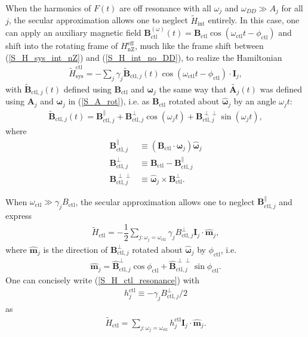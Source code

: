 \documentclass[twocolumn]{revtex4-1}
\renewcommand{\t}{\text} %
\newcommand{\f}[2]{\dfrac{#1}{#2}} %
\newcommand{\p}[1]{\left(#1\right)} %
\renewcommand{\v}{\bm} %
\newcommand{\uv}[1]{\hat{\v{#1}}} %
\renewcommand{\c}{\cdot} %
\begin{document}
When the harmonics of $F\p{t}$ are off resonance with all $\omega_j$
and $\omega_{DD}\gg A_j$ for all $j$, the secular approximation allows
one to neglect $\tilde H_\t{int}$ entirely. In this case, one can
apply an auxiliary magnetic field
$\v B_\t{ctl}^{\p\omega}\p{t}=\v
B_\t{ctl}\cos\p{\omega_\t{ctl}t-\phi_\t{ctl}}$ and shift into the
rotating frame of $H_\t{nZ}^\t{eff}$, much like the frame shift
between (\ref{S_H_sys_int_nZ}) and (\ref{S_H_int_no_DD}), to realize
the Hamiltonian
\begin{align}
  \tilde H_\t{sys}^\t{ctl} =
  -\sum_j\gamma_j\tilde{\v B}_{\t{ctl},j}\p{t}
  \cos\p{\omega_\t{ctl}t-\phi_\t{ctl}}\c\v I_j,
\end{align}
with $\tilde{\v B}_{\t{ctl},j}\p{t}$ defined using $\v B_\t{ctl}$ and
$\v\omega_j$ the same way that $\tilde{\v A_j}\p{t}$ was defined using
$\v A_j$ and $\v\omega_j$ in (\ref{S_A_rot}), i.e. as $\v B_\t{ctl}$
rotated about $\uv\omega_j$ by an angle $\omega_jt$:
\begin{align}
  \tilde{\v B}_{\t{ctl},j}\p{t} = \v B_{\t{ctl},j}^\parallel
  + \v B_{\t{ctl},j}^\perp\cos\p{\omega_jt}
  + \v B_{\t{ctl},j}^{\perp\perp}\sin\p{\omega_jt},
\end{align}
where
\begin{align}
  \v B_{\t{ctl},j}^\parallel
  &\equiv \p{\v B_\t{ctl} \c\uv\omega_j}\uv\omega_j \\
  \v B_{\t{ctl},j}^\perp
  &\equiv \v B_\t{ctl} - \v B_{\t{ctl},j}^\parallel \\
  \v B_{\t{ctl},j}^{\perp\perp}
  &\equiv \uv\omega_j\times\v B_\t{ctl}^\perp.
\end{align}

When $\omega_\t{ctl}\gg\gamma_jB_\t{ctl}$, the secular approximation
allows one to neglect $\v B_{\t{ctl},j}^\parallel$ and express
\begin{align}
  \tilde H_\t{ctl} = -\f12\sum_{j:\omega_j=\omega_\t{ctl}}
  \gamma_jB_{\t{ctl},j}^\perp \v I_j\c\uv m_j,
  \label{S_H_ctl_resonance}
\end{align}
where $\uv m_j$ is the direction of $\v B_{\t{ctl},j}^\perp$ rotated
about $\uv\omega_j$ by $\phi_\t{ctl}$, i.e.
\begin{align}
  \uv m_j = \uv B_{\t{ctl},j}^\perp\cos\phi_\t{ctl} +
  \uv B_{\t{ctl},j}^{\perp\perp}\sin\phi_\t{ctl}.
\end{align}
One can concisely write (\ref{S_H_ctl_resonance}) with
\begin{align}
  h_j^\t{ctl}\equiv-\gamma_jB_{\t{ctl},j}^\perp/2
\end{align}
as
\begin{align}
  \tilde H_\t{ctl} = \sum_{j:\omega_j=\omega_\t{ctl}}
  h_j^\t{ctl}\v I_j\c\uv m_j.
  \label{S_H_ctl}
\end{align}
\end{document}
